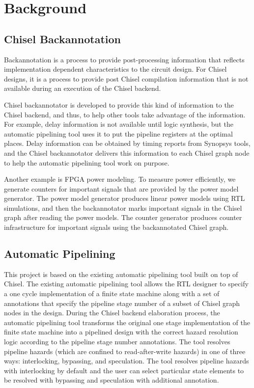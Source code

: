 \section{Background}
\subsection{Chisel Backannotation}
Backannotation is a process to provide post-processing information that reflects implementation dependent characteristics to the circuit design. For Chisel designs, it is a process to provide post Chisel compilation information that is not available during an execution of the Chisel backend.

Chisel backannotator is developed to provide this kind of information to the Chisel backend, and thus, to help other tools take advantage of the information. For example, delay information is not available until logic synthesis, but the automatic pipelining tool uses it to put the pipeline registers at the optimal places. Delay information can be obtained by timing reports from Synopsys tools, and the Chisel backannotator delivers this information to each Chisel graph node to help the automatic pipelining tool work on purpose.

Another example is FPGA power modeling. To measure power efficiently, we generate counters for important signals that are provided by the power model generator. The power model generator produces linear power models using RTL simulations, and then the backannotator marks important signals in the Chisel graph after reading the power models. The counter generator produces counter infrastructure for important signals using the backannotated Chisel graph.

\subsection{Automatic Pipelining}
\label{sec:related-work}
This project is based on the existing automatic pipelining tool built on top of Chisel\cite{Bachrach:2012}. The existing automatic pipelining tool allows the RTL designer to specify a one cycle implementation of a finite state machine along with a set of annotations that specify the pipeline stage number of a subset of Chisel graph nodes in the design. During the Chisel backend elaboration process, the automatic pipelining tool transforms the original one stage implementation of the finite state machine into a pipelined design with the correct hazard resolution logic according to the pipeline stage number annotations. The tool resolves pipeline hazards (which are confined to read-after-write hazards) in one of three ways: interlocking, bypassing, and speculation. The tool resolves pipeline hazards with interlocking by default and the user can select particular state elements to be resolved with bypassing and speculation with additional annotation.

